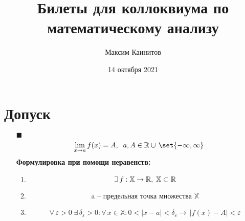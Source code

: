 \documentclass{article}
\title{Билеты для коллоквиума по математическому анализу}
\author{Максим Каинитов}
\date{14 октября 2021}
\theoremstyle{plain}
\def\letus{%
    \mathord{\setbox0=\hbox{$\exists$}%
             \hbox{\kern 0.125\wd0%
                   \vbox to \ht0{%
                      \hrule width 0.75\wd0%
                      \vfill%
                      \hrule width 0.75\wd0}%
                   \vrule height \ht0%
                   \kern 0.125\wd0}%
           }%
}
\begin{document}
\maketitle
\section{Допуск}
\begin{enumerate}
\item[$\blacksquare$] $$\lim_{x \to a} f(x) = A, \;\; a, A \in \mathbb{R} \cup \, \set{-\infty, \infty} $$
\textbf{Формулировка при помощи неравенств:}
\begin{enumerate}
\item$$\letus{}\, f: \mathbb{X} \to \mathbb{R}, \; \mathbb{X} \subset \mathbb{R} $$
\item$$\text{a -- предельная точка множества } \mathbb{X}  $$
\item$$\forall\, \varepsilon > 0 \; \exists \, \delta_{\varepsilon} > 0 : \forall\, x \in \mathbb{X}: 0 < |x - a| < \delta_{\varepsilon} \rightarrow\, |f(x) - A| < \varepsilon$$
\end{enumerate}


\end{enumerate}
\end{document}
